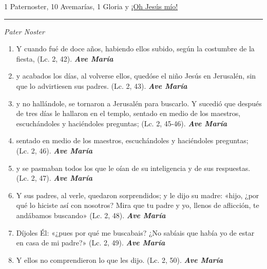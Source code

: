 \documentclass[a4paper,11pt, oneside]{report}
\begin{document}
{{    \medskip

    1 Paternoster, 10 Avemarías, 1 Gloria y \hyperlink{finalPerdida}{¡Oh Jesús mío!}

    \medskip

    \begin{center}\rule{1\linewidth}{\linethickness}\end{center}

    \medskip
    \textit{Pater Noster}

    \begin{enumerate}

      \item Y cuando fué de doce años, habiendo ellos subido, según la costumbre de la fiesta, (Lc. 2, 42). \textbf{\textit{Ave María}}

      \item y acabados los días, al volverse ellos, quedóse el niño Jesús en Jerusalén, sin que lo advirtiesen sus padres. (Lc. 2, 43). \textbf{\textit{Ave María}}

      \item y no hallándole, se tornaron a Jerusalén para buscarlo. Y sucedió que después de tres días le hallaron en el templo,
      sentado en medio de los maestros, escuchándoles y haciéndoles preguntas; (Lc. 2, 45-46). \textbf{\textit{Ave María}}

      \item sentado en medio de los maestros, escuchándoles y haciéndoles preguntas; (Lc. 2, 46). \textbf{\textit{Ave María}}

      \item y se pasmaban todos los que le oían de su inteligencia y de sus respuestas. (Lc. 2, 47). \textbf{\textit{Ave María}}

      \item Y sus padres, al verle, quedaron sorprendidos; y le dijo su madre: «hijo, ¿por qué lo hiciste así con nosotros? Mira que tu padre
      y yo, llenos de aflicción, te andábamos buscando» (Lc. 2, 48). \textbf{\textit{Ave María}}

      \item Díjoles Él: «¿pues por qué me buscabais? ¿No sabíais que había yo de estar en casa de mi padre?» (Lc. 2, 49). \textbf{\textit{Ave María}}

      \item Y ellos no comprendieron lo que les dijo. (Lc. 2, 50). \textbf{\textit{Ave María}}


\end{enumerate}}}
\end{document}
